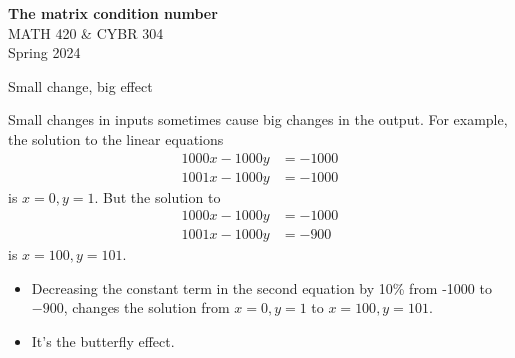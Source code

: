 \documentclass[usenames,dvipsnames,fleqn]{beamer}
\author[BW]{BW}
\theoremstyle{definition}
\begin{document}
\begin{frame}
\begin{flushleft} 
\large
\textbf{The matrix condition number} \\
\normalsize
\vspace{0.25in}
MATH 420 \& CYBR 304 \\
Spring 2024 
\end{flushleft}



\end{frame}

\begin{frame}{Small change, big effect}


Small changes in inputs sometimes cause big changes in the output. For example, the 
solution to the linear equations
\begin{align*}
    1000 x - 1000 y &= -1000\\
   1001 x - 1000 y &= -1000
\end{align*}
is \(x = 0, y = 1 \).  But the solution to
\begin{align*}
    1000 x - 1000 y &= -1000 \\
   1001 x - 1000 y &= -900
\end{align*}
is \(x=100,y=101\). 


\begin{itemize}

\item  Decreasing the constant term in the second equation by 10\% from -1000 to  \(-900\), 
changes the solution from \(x=0,y=1\) to 
 \(x=100,y=101\). 
 
 \item It's the butterfly effect.
\end{itemize}

\end{frame}
\end{document}
